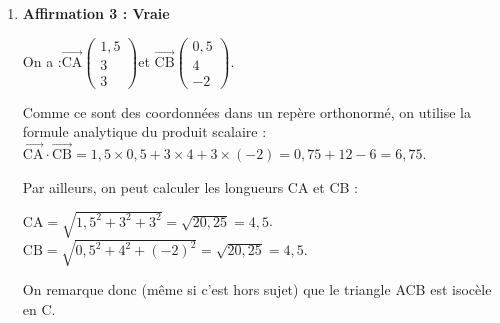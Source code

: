 \documentclass[10pt]{article}
\providecommand{\vectt}[1]{\overrightarrow{\mathrm{#1}}}
\begin{document}
\begin{enumerate}
\begin{enumerate}
			$\begin{aligned}
				\begin{cases}
					3-s = t\\
					s = -1,5 - t\\
					2 -5s = 2 - 2t
				\end{cases}
				&\iff \begin{cases}
					3-s = t\\
					s = -1,5 - (3 - s)\\
					2 -5s = 2 - 2(3 - s)
				\end{cases}\\
				&\iff \begin{cases}
					3-s = t\\
					s = -1,5 - 3 + s\\
					2 -5s = 2 - 6 + 2s
				\end{cases}\\
			\end{aligned} $

			Les équations du système sont incompatibles (la deuxième équation est équivaut à $0 = -4,5$).

			Le système n'a pas de solution.

			Il n'y a donc aucun point commun entre les droites (AB) et $(d)$, qui sont donc non coplanaires, et pas sécantes.

			\item \textbf{Affirmation 3 : Vraie}

			On a :\quad $\vectt{CA} \begin{pmatrix} 1,5\\3\\3 \end{pmatrix} $\quad et \quad $\vectt{CB} \begin{pmatrix} 0,5\\4\\-2 \end{pmatrix} $.

			Comme ce sont des coordonnées dans un repère orthonormé, on utilise la formule analytique du produit scalaire :\quad $\vectt{CA}\cdot\vectt{CB} = 1,5 \times 0,5 + 3 \times 4 + 3 \times (-2) = 0,75 + 12 - 6 = 6,75$.

			Par ailleurs, on peut calculer les longueurs CA et CB :

			$\mathrm{CA} = \sqrt{1,5^2 + 3^2 + 3^2} = \sqrt{20,25} = 4,5$.\quad $\mathrm{CB} = \sqrt{0,5^2 + 4^2 + (-2)^2} = \sqrt{20,25} = 4,5$.

			On remarque donc (même si c'est hors sujet) que le triangle ACB est isocèle en C.


\end{enumerate}
\end{enumerate}
\end{document}
